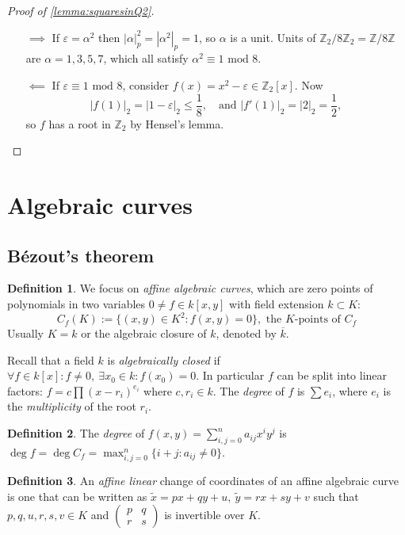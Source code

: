 \documentclass{article}
\newcommand{\Z}{\mathbb{Z}}
\newcommand{\Mod}{\text{ mod }}
\theoremstyle{definition}
\newtheorem{defn}{Definition}[subsection]
\begin{document}
\begin{proof}[Proof of \ref{lemma:squaresinQ2}]
\begin{itemize}
\item[$\implies$] If $\varepsilon=\alpha^2$ then $|\alpha|_p^2=|\alpha^2|_p=1$, so $\alpha$ is a unit. Units of $\Z_2/8\Z_2=\Z/8\Z$ are $\alpha=1,3,5,7$, which all satisfy $\alpha^2\equiv 1\Mod 8$.
\item[$\impliedby$] If $\varepsilon\equiv 1\Mod 8$, consider $f(x)=x^2-\varepsilon\in\Z_2[x]$. Now
\[
|f(1)|_2=|1-\varepsilon|_2\leq\frac18,\quad\text{and } |f'(1)|_2=|2|_2=\frac12,
\]
so $f$ has a root in $\Z_2$ by Hensel's lemma.
\end{itemize}
\end{proof}

\section{Algebraic curves}
\subsection{Bézout's theorem}
\begin{defn}
We focus on \textit{affine algebraic curves}, which are zero points of polynomials in two variables $0\neq f\in k[x,y]$ with field extension $k\subset K$:
\[
C_f(K):=\{(x,y)\in K^2:f(x,y)=0\},\text{ the }K\text{-points of }C_f
\]
Usually $K=k$ or the algebraic closure of $k$, denoted by $\overline k$.
\end{defn}

Recall that a field $k$ is \textit{algebraically closed} if $\forall f\in k[x]:f\neq 0,\ \exists x_0\in k:f(x_0)=0$. In particular $f$ can be split into linear factors: $f=c\prod (x-r_i)^{e_i}$ where $c,r_i\in k$. The \textit{degree} of $f$ is $\sum e_i$, where $e_i$ is the \textit{multiplicity} of the root $r_i$.

\begin{defn}
The \textit{degree} of $f(x,y)=\sum_{i,j=0}^n a_{ij}x^iy^j$ is $\deg f=\deg C_f=\max_{i,j=0}^n\{i+j:a_{ij}\neq 0\}$.
\end{defn}

\begin{defn}
An \textit{affine linear} change of coordinates of an affine algebraic curve is one that can be written as $\widetilde x=px+qy+u,\ \widetilde y=rx+sy+v$ such that $p,q,u,r,s,v\in K$ and $\begin{pmatrix}p&q\\r&s\end{pmatrix}$ is invertible over $K$.
\end{defn}
\end{document}
